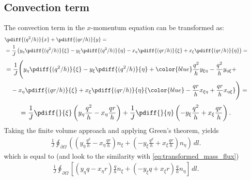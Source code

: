 \subsection{Convection term}
The convection term in the $x$-momentum equation can be transformed as:
%
\begin{align}
	&\pdiff{(q^2/h)}{x} + \pdiff{(qr/h)}{y} =
\\
	&= \frac{1}{J} \left(y_{\eta} \pdiff{(q^2/h)}{\xi} - y_{\xi} \pdiff{(q^2/h)}{\eta} -x_{\eta} \pdiff{(qr/h)}{\xi} + x_{\xi} \pdiff{(qr/h)}{\eta}\right) =
\end{align}
\begin{align}
	\begin{aligned}
		&= \frac{1}{J} \Bigg(y_{\eta} \pdiff{(q^2/h)}{\xi} - y_{\xi} \pdiff{(q^2/h)}{\eta} + {\color{blue}\frac{q^2}{h}  y_{\xi\eta} - \frac{q^2}{h} y_{\eta\xi}} +  \\
		&\quad -x_{\eta} \pdiff{(qr/h)}{\xi} + x_{\xi} \pdiff{(qr/h)}{\eta} {\color{blue} - \frac{qr}{h}  x_{\xi\eta} + \frac{qr}{h} x_{\eta\xi}} \Bigg) =
	\end{aligned}
\end{align}
\begin{align}
	= \frac{1}{J} \pdiff{}{\xi}\left(y_{\eta} \frac{q^2}{h} - x_{\eta} \frac{qr}{h} \right) + \frac{1}{J} \pdiff{}{\eta}\left(-y_{\xi} \frac{q^2}{h} + x_{\xi} \frac{qr}{h} \right).
\end{align}
%
Taking the finite volume approach and applying Green's theorem, yields
\begin{align}
    \frac{1}{J}\oint_{\partial\Omega} \left( \left( y_{\eta}\frac{q^2}{h} - x_{\eta} \frac{qr}{h} \right) n_\xi + \left(-y_{\xi} \frac{q^2}{h} + x_{\xi} \frac{qr}{h} \right) n_\eta \right)\, dl.
\end{align}
which is equal to (and look to the similarity with \autoref{eq:transformed_mass_flux})
\begin{align}
    \frac{1}{J}\oint_{\partial\Omega} \left[  \left( y_{\eta}q - x_{\eta} r \right) \frac{q}{h}  n_\xi + \left( -y_{\xi}q  + x_{\xi}r\right) \frac{q}{h} n_\eta \right] \, dl.\label{eq:transformed_convection_x}
\end{align}

